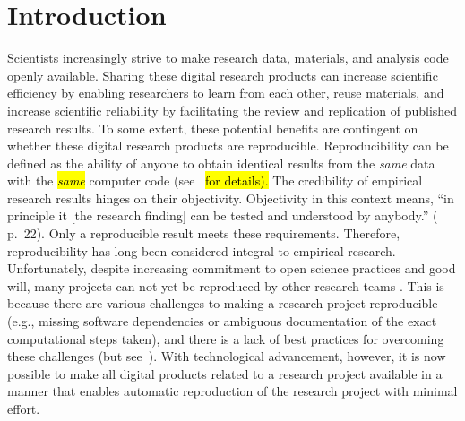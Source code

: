 \documentclass[psych,tutorial,accept,moreauthors,pdftex]{Definitions/mdpi}
\begin{document}


\section{Introduction}\label{introduction}

Scientists increasingly strive to make research data, materials, and
analysis code openly available. Sharing these digital research products
can increase scientific efficiency by enabling researchers to learn from
each other, reuse materials, and increase scientific reliability by
facilitating the review and replication of published research results.
To some extent, these potential benefits are contingent on whether these
digital research products are reproducible. Reproducibility can be
defined as the ability of anyone to obtain identical results from the
\emph{same} data with the \hl{\emph{same}}
 computer code (see~\citep{Peikert2019} \hl{for
details).}
 The credibility of empirical research results
hinges on their objectivity. Objectivity in this context means, ``in
principle it {[}the research finding{]} can be tested and understood by
anybody.'' (\citep{popperLogicScientificDiscovery2002} p.~22). Only a
reproducible result meets these requirements. Therefore, reproducibility
has long been considered integral to empirical research. Unfortunately,
despite increasing commitment to open science practices and good will,
many projects can not yet be reproduced by other research teams
\citep{obels2020}. This is because there are various challenges to
making a research project reproducible (e.g., missing software
dependencies or ambiguous documentation of the exact computational steps
taken), and there is a lack of best practices for overcoming these
challenges (but see~\citep{vanlissa2020worcs}). With technological
advancement, however, it is now possible to make all digital products
related to a research project available in a manner that enables
automatic reproduction of the research project with minimal effort.
\end{document}
